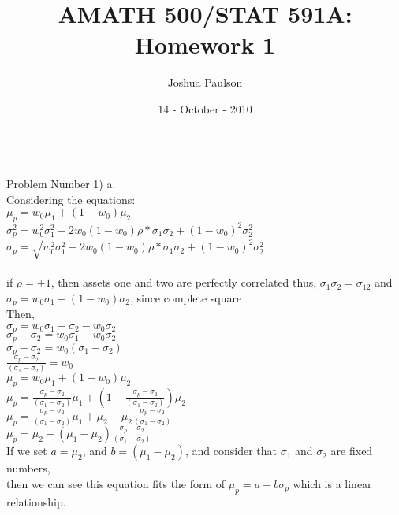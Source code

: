 \documentclass[11pt]{article}
\title{AMATH 500/STAT 591A: Homework 1}
\author{Joshua Paulson}
\date{14 - October - 2010}
\begin{document}
\maketitle{\textbf{}}\\
Problem Number 1) a.\\

\indent Considering the equations:\\
$\mu_{p} = w_{0}\mu_{1} + (1-w_{0})\mu_{2}$\\
$\sigma^{2}_{p} = w^{2}_{0}\sigma^{2}_{1} + 2w_{0}(1 - w_{0})\rho*\sigma_{1}\sigma_{2} + (1 - w_{0})^{2} \sigma^{2}_{2}$\\
$\sigma_{p} = \sqrt{w^{2}_{0}\sigma^{2}_{1} + 2w_{0}(1 - w_{0})\rho*\sigma_{1}\sigma_{2} + (1 - w_{0})^{2} \sigma^{2}_{2}}$\\
\\
if $\rho = +1$, then assets one and two are perfectly correlated thus, $\sigma_{1}\sigma_{2} = \sigma_{1 2}$ and\\
$\sigma_{p} = w_{0}\sigma_{1} + (1 - w_{0})\sigma_{2}$, since complete square\\
Then,\\
$\sigma_{p} = w_{0}\sigma_{1} + \sigma_{2} - w_{0}\sigma_{2}$\\
$\sigma_{p} - \sigma_{2} = w_{0}\sigma_{1} - w_{0}\sigma_{2}$\\
$\sigma_{p} - \sigma_{2} = w_{0}(\sigma_{1} - \sigma_{2})$\\
$\frac{\sigma_{p} - \sigma_{2}}{(\sigma_{1} - \sigma_{2})} = w_{0}$\\

$\mu_{p} = w_{0}\mu_{1} + (1-w_{0})\mu_{2}$\\
$\mu_{p} = \frac{\sigma_{p} - \sigma_{2}}{(\sigma_{1} - \sigma_{2})}\mu_{1} + (1-\frac{\sigma_{p} - \sigma_{2}}{(\sigma_{1} - \sigma_{2})})\mu_{2}$\\
$\mu_{p} = \frac{\sigma_{p} - \sigma_{2}}{(\sigma_{1} - \sigma_{2})}\mu_{1} + \mu_{2} - \mu_{2}\frac{\sigma_{p} - \sigma_{2}}{(\sigma_{1} - \sigma_{2})}$\\
$\mu_{p} = \mu_{2} + (\mu_{1} - \mu_{2})\frac{\sigma_{p} - \sigma_{2}}{(\sigma_{1} - \sigma_{2})}$\\
If we set $a = \mu_{2}$, and $b = (\mu_{1} - \mu_{2})$, and consider that $\sigma_{1}$ and $\sigma_{2}$ are fixed numbers,\\
then we can see this equation fits the form of $\mu_{p} = a + b\sigma_{p}$ which is a linear relationship.\\
\end{document}
